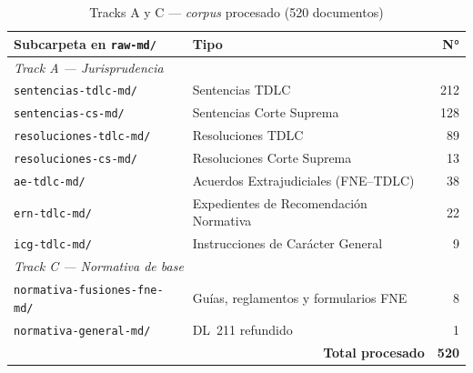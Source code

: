 \documentclass[12pt,a4paper]{article}
\begin{document}
\begin{table}[htbp]
\centering
\caption{Tracks A y C — \textit{corpus} procesado (520 documentos)}
\label{tab:track-a}
\footnotesize
\begin{tabular}{@{}l l r@{}}
\toprule
\rowcolor{tabhead}\color{black}\textbf{Subcarpeta en \texttt{raw-md/}} &
  \color{black}\textbf{Tipo} &
  \color{black}\textbf{N°} \\
\midrule
\multicolumn{3}{l}{\itshape Track A — Jurisprudencia} \\
\texttt{sentencias-tdlc-md/} & Sentencias TDLC & 212 \\
\texttt{sentencias-cs-md/} & Sentencias Corte Suprema & 128 \\
\texttt{resoluciones-tdlc-md/} & Resoluciones TDLC & 89 \\
\texttt{resoluciones-cs-md/} & Resoluciones Corte Suprema & 13 \\
\texttt{ae-tdlc-md/} & Acuerdos Extrajudiciales (FNE–TDLC) & 38 \\
\texttt{ern-tdlc-md/} & Expedientes de Recomendación Normativa & 22 \\
\texttt{icg-tdlc-md/} & Instrucciones de Carácter General & 9 \\
\midrule
\multicolumn{3}{l}{\itshape Track C — Normativa de base} \\
\texttt{normativa-fusiones-fne-md/} & Guías, reglamentos y formularios FNE & 8 \\
\texttt{normativa-general-md/} & DL~211 refundido & 1 \\
\midrule
\multicolumn{2}{r}{\textbf{Total procesado}} & \textbf{520} \\
\bottomrule
\end{tabular}
\end{table}
\end{document}
